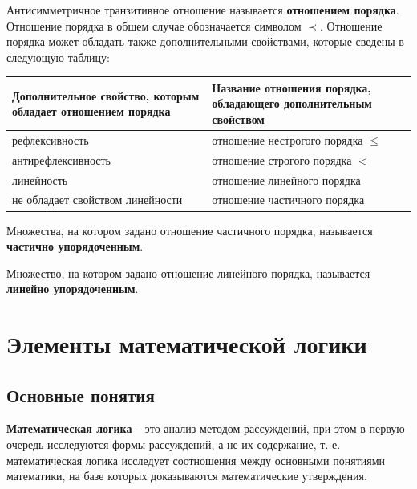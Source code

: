 \documentclass[a5paper, 11pt]{extarticle}
\theoremstyle{definition}
\theoremstyle{definition}
\theoremstyle{definition}
\numberwithin{figure}{section}
\numberwithin{table}{section}
\begin{document}
Антисимметричное транзитивное отношение называется \textbf{отношением порядка}. Отношение порядка в общем случае обозначается символом \(\prec\). Отношение порядка может обладать также дополнительными свойствами, которые сведены в следующую таблицу:

\begin{center}
    \renewcommand*{\arraystretch}{1.5}
    \begin{longtable}{|C{0.45\textwidth}|C{0.45\textwidth}|}
        \hline
        Дополнительное свойство, которым обладает отношением порядка & Название отношения порядка, обладающего дополнительным свойством \\
        \hline
        рефлексивность                                               & отношение нестрогого порядка \(\leq\)                            \\
        \hline
        антирефлексивность                                           & отношение строгого порядка \(<\)                                 \\
        \hline
        линейность                                                   & отношение линейного порядка                                      \\
        \hline
        не обладает свойством линейности                             & отношение частичного порядка                                     \\
        \hline
    \end{longtable}
\end{center}

Множества, на котором задано отношение частичного порядка, называется \textbf{частично упорядоченным}.

Множество, на котором задано отношение линейного порядка, называется \textbf{линейно упорядоченным}.

\section{Элементы математической логики}

\subsection{Основные понятия}

\textbf{Математическая логика} -- это анализ методом рассуждений, при этом в первую очередь исследуются формы рассуждений, а не их содержание, т. е. математическая логика исследует соотношения между основными понятиями математики, на базе которых доказываются математические утверждения.
\end{document}
